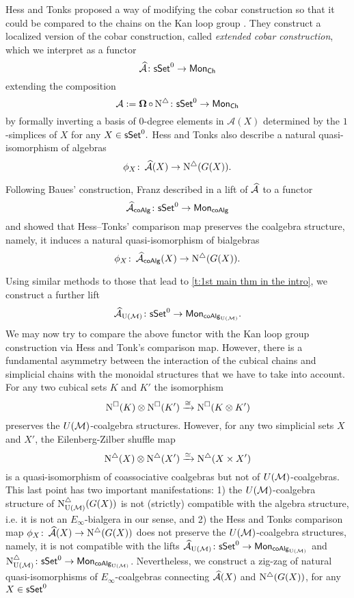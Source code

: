 Hess and Tonks proposed a way of modifying the cobar construction so that it could be compared to the chains on the Kan loop group \cite{hess2010cobar}. They construct a localized version of the cobar construction, called \textit{extended cobar construction}, which we interpret as a functor
$$\operatorname{\mathcal{\widehat{A}}} \colon \mathsf{sSet}^0 \to \mathsf{Mon}_{\mathsf{Ch}}$$
extending the composition $$\operatorname{\mathcal{A}}:= \operatorname{\mathbf{\Omega}} \circ \operatorname{N^{\triangle}} \colon \mathsf{sSet}^0 \to \mathsf{Mon}_{\mathsf{Ch}}$$ by formally inverting a basis of $0$-degree elements in $\mathcal{A}(X)$ determined by the $1$-simplices of $X$ for any $X \in \mathsf{sSet}^0.$ Hess and Tonks also describe a natural quasi-isomorphism of algebras
\begin{equation*}
\phi_X \colon \operatorname{\mathcal{\widehat{A}}}(X) \to \operatorname{N^{\triangle}}(G(X)).
\end{equation*}


Following Baues’ construction, Franz described in \cite{franz2020szczarba} a lift of $\operatorname{\mathcal{\widehat{A}}}$ to a functor
\begin{equation*}
\operatorname{\mathcal{\widehat{A}}}_{\mathsf{coAlg}} \colon \mathsf{sSet}^0 \to \mathsf{Mon}_{\mathsf{coAlg}}
\end{equation*}
and showed that Hess--Tonks' comparison map preserves the coalgebra structure, namely, it induces a natural quasi-isomorphism of bialgebras
\begin{equation*}
\phi_X \colon \operatorname{\mathcal{\widehat{A}}}_{\mathsf{coAlg}}(X) \to \operatorname{N^{\triangle}} (G(X)).
\end{equation*}

Using similar methods to those that lead to \cref{t:1st main thm in the intro}, we construct a further lift
\begin{equation*}
\operatorname{\mathcal{\widehat{A}}}_{\operatorname{U}(\mathcal{M})} \colon \mathsf{sSet}^0 \to \mathsf{Mon}_{\mathsf{coAlg}_{\operatorname{U}(\mathcal{M})}}.
\end{equation*}
We may now try to compare the above functor with the Kan loop group construction via Hess and Tonk's comparison map. However, there is a fundamental asymmetry between the interaction of the cubical chains and simplicial chains with the monoidal structures that we have to take into account. For any two cubical sets $K$ and $K'$ the isomorphism $$\operatorname{N^{\square}}(K) \otimes \operatorname{N^{\square}}(K') \xrightarrow{\cong} \operatorname{N^{\square}}(K \otimes K')$$ preserves the $U(\mathcal{M})$-coalgebra structures. However, for any two simplicial sets $X$ and $X'$, the Eilenberg-Zilber shuffle map $$\operatorname{N^{\triangle}}(X) \otimes \operatorname{N^{\triangle}}(X') \xrightarrow{\simeq} \operatorname{N^{\triangle}}(X \times X')$$ is a quasi-isomorphism of coassociative coalgebras but not of $U(\mathcal{M})$-coalgebras. This last point has two important manifestations: 1) the $U(\mathcal{M})$-coalgebra structure of $\operatorname{N^{\triangle}_{{\operatorname{U}(\mathcal{M})}}}(G(X))$ is not (strictly) compatible with the algebra structure, i.e. it is not an $E_{\infty}$-bialgera in our sense, and 2) the Hess and Tonks comparison map $\phi_X \colon \operatorname{\mathcal{\widehat{A}}}(X) \to \operatorname{N^{\triangle}}(G(X))$ does not preserve the $U(\mathcal{M})$-coalgebra structures, namely, it is not compatible with the lifts $\operatorname{\mathcal{\widehat{A}}}_{\operatorname{U}(\mathcal{M})} \colon \mathsf{sSet}^0 \to \mathsf{Mon}_{\mathsf{coAlg}_{\operatorname{U}(\mathcal{M})}}$
and $\operatorname{N^{\triangle}_{{\operatorname{U}(\mathcal{M})}}} \colon \mathsf{sSet}^0 \to \mathsf{Mon}_{\mathsf{coAlg}_{\operatorname{U}(\mathcal{M})}}$. Nevertheless, we construct a zig-zag of natural quasi-isomorphisms of $E_{\infty}$-coalgebras connecting $\operatorname{\mathcal{\widehat{A}}}(X)$ and $\operatorname{N^{\triangle}}(G(X))$, for any $X \in \mathsf{sSet}^0$

